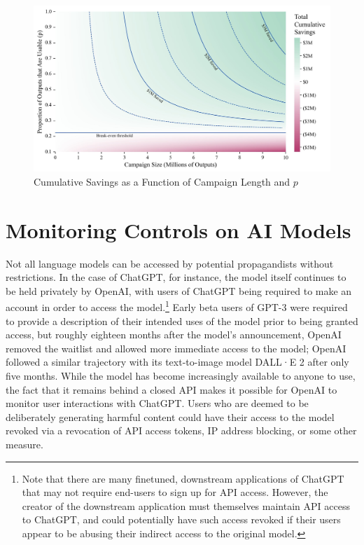 \documentclass{article}
\begin{document}
\begin{figure}[h]
  \centering
  \includegraphics[width=\textwidth]{figures/cumulative_savings_edited.jpg}
  \caption{Cumulative Savings as a Function of Campaign Length and $p$}
  \label{fig:cumulative}
\end{figure}

\section{Monitoring Controls on AI Models}
\label{sec:controls}

Not all language models can be accessed by potential propagandists without restrictions. In the case of ChatGPT, for instance, the model itself continues to be held privately by OpenAI, with users of ChatGPT being required to make an account in order to access the model.\footnote{Note that there are many finetuned, downstream applications of ChatGPT that may not require end-users to sign up for API access. However, the creator of the downstream application must themselves maintain API access to ChatGPT, and could potentially have such access revoked if their users appear to be abusing their indirect access to the original model.} Early beta users of GPT-3 were required to provide a description of their intended uses of the model prior to being granted access, but roughly eighteen months after the model's announcement, OpenAI removed the waitlist and allowed more immediate access to the model; OpenAI followed a similar trajectory with its text-to-image model DALL·E 2 after only five months.\cite{dallewaitlist, gpt3waitlist} While the model has become increasingly available to anyone to use, the fact that it remains behind a closed API makes it possible for OpenAI to monitor user interactions with ChatGPT. Users who are deemed to be deliberately generating harmful content could have their access to the model revoked via a revocation of API access tokens, IP address blocking, or some other measure. 
\end{document}
